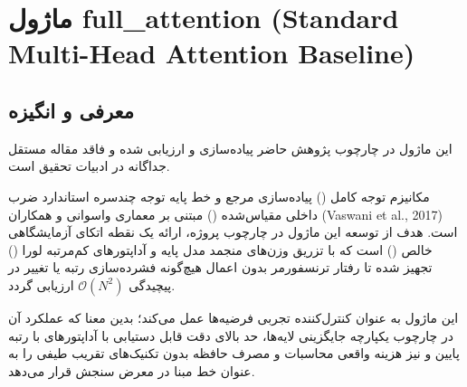 \section{ماژول full\_attention (Standard Multi-Head Attention Baseline)}
\label{sec:module_full_attention}

\subsection{معرفی و انگیزه}
این ماژول در چارچوب پژوهش حاضر پیاده‌سازی و ارزیابی شده و فاقد مقاله مستقل جداگانه در ادبیات تحقیق است.

مکانیزم توجه کامل () پیاده‌سازی مرجع و خط پایه توجه چندسره استاندارد ضرب داخلی مقیاس‌شده () مبتنی بر معماری واسوانی و همکاران (Vaswani et al., 2017) است. هدف از توسعه این ماژول در چارچوب پروژه، ارائه یک نقطه اتکای آزمایشگاهی خالص () است که با تزریق وزن‌های منجمد مدل پایه و آداپتورهای کم‌مرتبه لورا () تجهیز شده تا رفتار ترنسفورمر بدون اعمال هیچ‌گونه فشرده‌سازی رتبه یا تغییر در پیچیدگی $\mathcal{O}(N^2)$ ارزیابی گردد.

این ماژول به عنوان کنترل‌کننده تجربی فرضیه‌ها عمل می‌کند؛ بدین معنا که عملکرد آن در چارچوب یکپارچه جایگزینی لایه‌ها، حد بالای دقت قابل دستیابی با آداپتورهای با رتبه پایین و نیز هزینه واقعی محاسبات و مصرف حافظه بدون تکنیک‌های تقریب طیفی را به عنوان خط مبنا در معرض سنجش قرار می‌دهد.

